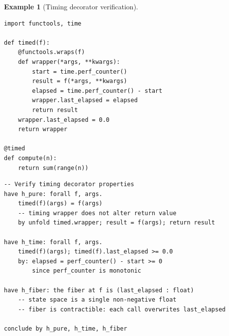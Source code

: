 \documentclass[11pt,a4paper]{report}
\theoremstyle{definition}
\newtheorem{example}[definition]{Example}
\theoremstyle{plain}
\begin{document}
\begin{example}[Timing decorator verification]
\begin{lstlisting}[style=python]
import functools, time

def timed(f):
    @functools.wraps(f)
    def wrapper(*args, **kwargs):
        start = time.perf_counter()
        result = f(*args, **kwargs)
        elapsed = time.perf_counter() - start
        wrapper.last_elapsed = elapsed
        return result
    wrapper.last_elapsed = 0.0
    return wrapper

@timed
def compute(n):
    return sum(range(n))
\end{lstlisting}

\begin{lstlisting}[style=proof]
-- Verify timing decorator properties
have h_pure: forall f, args.
    timed(f)(args) = f(args)
    -- timing wrapper does not alter return value
    by unfold timed.wrapper; result = f(args); return result

have h_time: forall f, args.
    timed(f)(args); timed(f).last_elapsed >= 0.0
    by: elapsed = perf_counter() - start >= 0
        since perf_counter is monotonic

have h_fiber: the fiber at f is (last_elapsed : float)
    -- state space is a single non-negative float
    -- fiber is contractible: each call overwrites last_elapsed

conclude by h_pure, h_time, h_fiber
\end{lstlisting}
\end{example}
\end{document}
